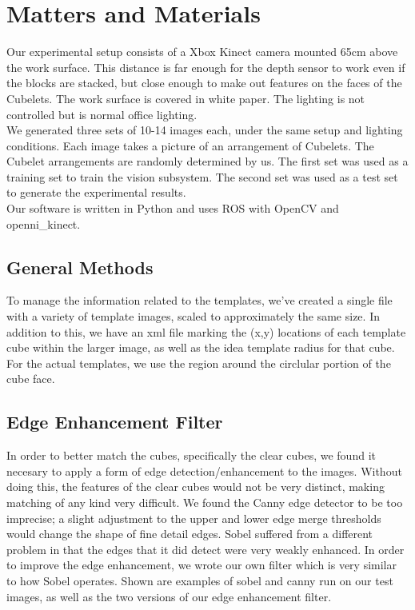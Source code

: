 \documentclass[conference]{IEEEtran}
\begin{document}

\section{Matters and Materials}
Our experimental setup consists of a Xbox Kinect camera mounted 65cm above the work surface. This distance is far enough for the depth sensor to work even if the blocks are stacked, but close enough to make out features on the faces of the Cubelets. The work surface is covered in white paper. The lighting is not controlled but is normal office lighting.\\

We generated three sets of 10-14 images each, under the same setup and lighting conditions. Each image takes a picture of an arrangement of Cubelets. The Cubelet arrangements are randomly determined by us. The first set was used as a training set to train the vision subsystem. The second set was used as a test set to generate the experimental results.\\

Our software is written in Python and uses ROS with OpenCV and openni\_kinect.

\subsection{General Methods}
To manage the information related to the templates, we've created a single file with a variety of template images, scaled to approximately the same size.  In addition to this, we have an xml file marking the (x,y) locations of each template cube within the larger image, as well as the idea template radius for that cube.  For the actual templates, we use the region around the circlular portion of the cube face.    

\subsection{Edge Enhancement Filter}
In order to better match the cubes, specifically the clear cubes, we found it necesary to apply a form of edge detection/enhancement to the images. Without doing this, the features of the clear cubes would not be very distinct, making matching of any kind very difficult.  We found the Canny edge detector to be too imprecise; a slight adjustment to the upper and lower edge merge thresholds would change the shape of fine detail edges. Sobel suffered from a different problem in that the edges that it did detect were very weakly enhanced.  In order to improve the edge enhancement, we  wrote our own filter which is very similar to how Sobel operates.  Shown are examples of sobel and canny run on our test images, as well as the two versions of our edge enhancement filter.  \\
\end{document}
